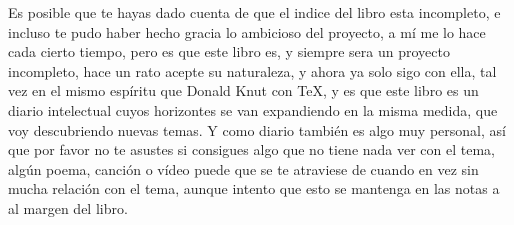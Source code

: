 Es posible que te hayas dado cuenta de que el indice del libro esta incompleto,
e incluso te pudo haber hecho gracia lo ambicioso del proyecto, a mí me lo hace
cada cierto tiempo, pero es que este libro es, y siempre sera un proyecto
incompleto, hace un rato acepte su naturaleza, y ahora ya solo sigo con ella,
tal vez en el mismo  espíritu que Donald Knut con \TeX, y es que este libro es
un diario intelectual cuyos horizontes se van expandiendo en la misma medida,
que voy descubriendo nuevas temas. Y como diario también es algo muy personal,
así que por favor no te asustes si consigues algo que no tiene nada ver con el
tema, algún poema, canción o vídeo puede que se te atraviese de cuando en vez
sin mucha relación con el tema, aunque intento que esto se mantenga en las
notas a al margen del libro.


